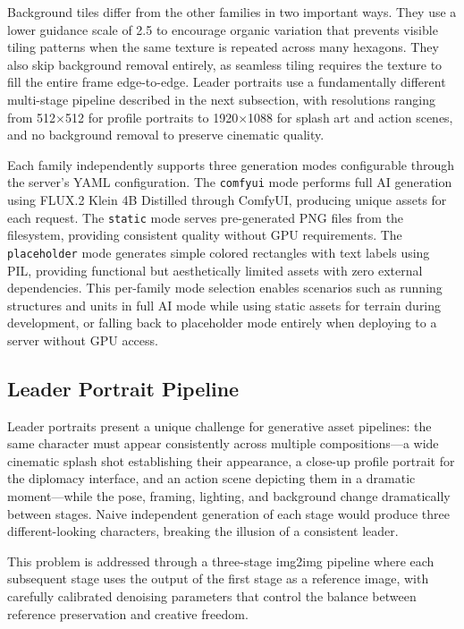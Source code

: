 \documentclass[conference]{IEEEtran}
\begin{document}
Background tiles differ from the other families in two important ways. They use a lower guidance scale of 2.5 to encourage organic variation that prevents visible tiling patterns when the same texture is repeated across many hexagons. They also skip background removal entirely, as seamless tiling requires the texture to fill the entire frame edge-to-edge. Leader portraits use a fundamentally different multi-stage pipeline described in the next subsection, with resolutions ranging from 512$\times$512 for profile portraits to 1920$\times$1088 for splash art and action scenes, and no background removal to preserve cinematic quality.

Each family independently supports three generation modes configurable through the server's YAML configuration. The \texttt{comfyui} mode performs full AI generation using FLUX.2 Klein 4B Distilled through ComfyUI, producing unique assets for each request. The \texttt{static} mode serves pre-generated PNG files from the filesystem, providing consistent quality without GPU requirements. The \texttt{placeholder} mode generates simple colored rectangles with text labels using PIL, providing functional but aesthetically limited assets with zero external dependencies. This per-family mode selection enables scenarios such as running structures and units in full AI mode while using static assets for terrain during development, or falling back to placeholder mode entirely when deploying to a server without GPU access.

\subsection{Leader Portrait Pipeline}


Leader portraits present a unique challenge for generative asset pipelines: the same character must appear consistently across multiple compositions---a wide cinematic splash shot establishing their appearance, a close-up profile portrait for the diplomacy interface, and an action scene depicting them in a dramatic moment---while the pose, framing, lighting, and background change dramatically between stages. Naive independent generation of each stage would produce three different-looking characters, breaking the illusion of a consistent leader.

This problem is addressed through a three-stage img2img pipeline where each subsequent stage uses the output of the first stage as a reference image, with carefully calibrated denoising parameters that control the balance between reference preservation and creative freedom.
\end{document}
